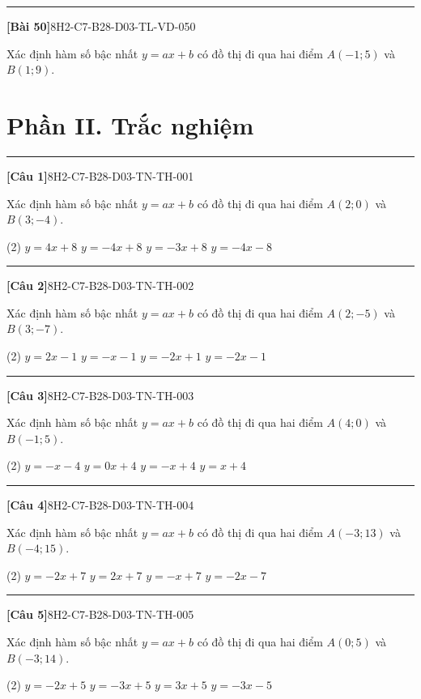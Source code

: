 \documentclass[12pt,a4paper]{article}
\newif\ifloigiai
\newenvironment{cauhoi}[2]{%
  \par\medskip\noindent\rule{\textwidth}{0.4pt}\par\nopagebreak
  \noindent\textbf{[#1]}\hfill{\scriptsize\ttfamily #2}\par\nopagebreak\smallskip}{\par}
\newcommand{\loigiai}[1]{\ifloigiai\par\smallskip\noindent\textit{Lời giải.} #1\par\fi}
\newcommand{\dapan}[1]{\ifloigiai\par\smallskip\noindent\textit{Đáp án:} \textbf{#1}\par\fi}
\begin{document}
\begin{cauhoi}{Bài 50}{8H2-C7-B28-D03-TL-VD-050}
Xác định hàm số bậc nhất $y=ax+b$ có đồ thị đi qua hai điểm $A(-1;5)$ và $B(1;9)$.
\loigiai{Thay toạ độ $A$, $B$ vào $y=ax+b$ ta có hệ $5=-a+b$ và $9=a+b$. Trừ hai vế: $a=\dfrac{5-9}{-1-1}=2$. Suy ra $b=5-2\cdot(-1)=7$. Vậy $y=2x+7$.}
\end{cauhoi}
\clearpage\section*{Phần II. Trắc nghiệm}
\begin{cauhoi}{Câu 1}{8H2-C7-B28-D03-TN-TH-001}
Xác định hàm số bậc nhất $y=ax+b$ có đồ thị đi qua hai điểm $A(2;0)$ và $B(3;-4)$.
\begin{tasks}(2)
\task $y=4x+8$
\task $y=-4x+8$
\task $y=-3x+8$
\task $y=-4x-8$
\end{tasks}
\dapan{B}
\end{cauhoi}
\begin{cauhoi}{Câu 2}{8H2-C7-B28-D03-TN-TH-002}
Xác định hàm số bậc nhất $y=ax+b$ có đồ thị đi qua hai điểm $A(2;-5)$ và $B(3;-7)$.
\begin{tasks}(2)
\task $y=2x-1$
\task $y=-x-1$
\task $y=-2x+1$
\task $y=-2x-1$
\end{tasks}
\dapan{D}
\end{cauhoi}
\begin{cauhoi}{Câu 3}{8H2-C7-B28-D03-TN-TH-003}
Xác định hàm số bậc nhất $y=ax+b$ có đồ thị đi qua hai điểm $A(4;0)$ và $B(-1;5)$.
\begin{tasks}(2)
\task $y=-x-4$
\task $y=0x+4$
\task $y=-x+4$
\task $y=x+4$
\end{tasks}
\dapan{C}
\end{cauhoi}
\begin{cauhoi}{Câu 4}{8H2-C7-B28-D03-TN-TH-004}
Xác định hàm số bậc nhất $y=ax+b$ có đồ thị đi qua hai điểm $A(-3;13)$ và $B(-4;15)$.
\begin{tasks}(2)
\task $y=-2x+7$
\task $y=2x+7$
\task $y=-x+7$
\task $y=-2x-7$
\end{tasks}
\dapan{A}
\end{cauhoi}
\begin{cauhoi}{Câu 5}{8H2-C7-B28-D03-TN-TH-005}
Xác định hàm số bậc nhất $y=ax+b$ có đồ thị đi qua hai điểm $A(0;5)$ và $B(-3;14)$.
\begin{tasks}(2)
\task $y=-2x+5$
\task $y=-3x+5$
\task $y=3x+5$
\task $y=-3x-5$
\end{tasks}
\dapan{B}
\end{cauhoi}
\end{document}
